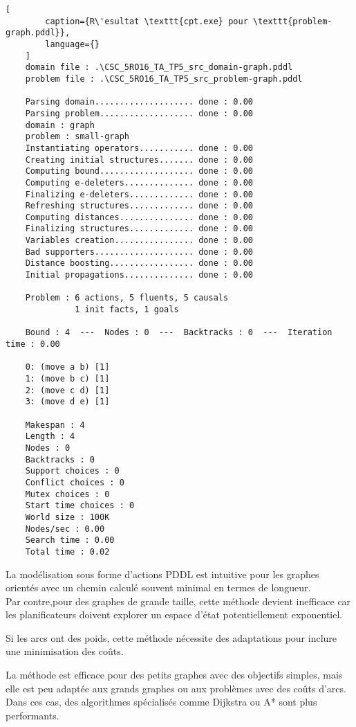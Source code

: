 \documentclass[../CSC_5RO16_TA_TP5.tex]{subfiles}
\begin{document}
\begin{scriptsize}\mycode
	\begin{lstlisting}[
        caption={R\'esultat \texttt{cpt.exe} pour \texttt{problem-graph.pddl}},
        language={}
    ]
    domain file : .\CSC_5RO16_TA_TP5_src_domain-graph.pddl
    problem file : .\CSC_5RO16_TA_TP5_src_problem-graph.pddl
    
    Parsing domain.................... done : 0.00
    Parsing problem................... done : 0.00
    domain : graph
    problem : small-graph
    Instantiating operators........... done : 0.00
    Creating initial structures....... done : 0.00
    Computing bound................... done : 0.00
    Computing e-deleters.............. done : 0.00
    Finalizing e-deleters............. done : 0.00
    Refreshing structures............. done : 0.00
    Computing distances............... done : 0.00
    Finalizing structures............. done : 0.00
    Variables creation................ done : 0.00
    Bad supporters.................... done : 0.00
    Distance boosting................. done : 0.00
    Initial propagations.............. done : 0.00
    
    Problem : 6 actions, 5 fluents, 5 causals
              1 init facts, 1 goals
    
    Bound : 4  ---  Nodes : 0  ---  Backtracks : 0  ---  Iteration time : 0.00
    
    0: (move a b) [1]
    1: (move b c) [1]
    2: (move c d) [1]
    3: (move d e) [1]
    
    Makespan : 4
    Length : 4
    Nodes : 0
    Backtracks : 0
    Support choices : 0
    Conflict choices : 0
    Mutex choices : 0
    Start time choices : 0
    World size : 100K
    Nodes/sec : 0.00
    Search time : 0.00
    Total time : 0.02
    \end{lstlisting}
\end{scriptsize}


\noindent La modélisation sous forme d'actions PDDL est intuitive pour les graphes orientés avec un chemin calculé souvent minimal en termes de longueur.\\

\noindent Par contre,pour des graphes de grande taille, cette méthode devient inefficace car les planificateurs doivent explorer un espace d'état potentiellement exponentiel.

\begin{remark}
    Si les arcs ont des poids, cette méthode nécessite des adaptations pour inclure une minimisation des coûts.
\end{remark}

\noindent La méthode est efficace pour des petits graphes avec des objectifs simples, mais elle est peu adaptée aux grands graphes ou aux problèmes avec des coûts d'arcs. Dans ces cas, des algorithmes spécialisés comme Dijkstra ou A* sont plus performants.
\end{document}
